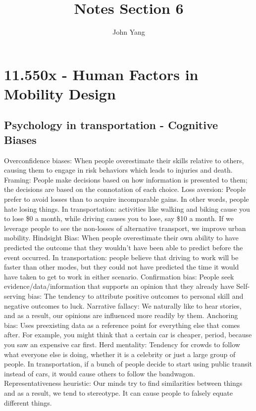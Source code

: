 \documentclass{article}
\title{Notes Section 6} %
\author{John Yang}
\begin{document}
    \maketitle
    \tableofcontents
    \section{11.550x - Human Factors in Mobility Design}
    \subsection{Psychology in transportation - Cognitive Biases}
    \begin{outline}
        \1 Overconfidence biases: When people overestimate their skills relative to others, causing them to engage in risk behaviors which leads to injuries and death. 
        \1 Framing: People make decisions based on how information is presented to them; the decisions are based on the connotation of each choice. 
        \1 Loss aversion: People prefer to avoid losses than to acquire incomparable gains. In other words, people hate losing things. 
            \2 In transportation: activities like walking and biking cause you to lose \$0 a month, while driving causes you to lose, say \$10 a month. If we leverage people to see the non-losses of alternative transport, we improve urban mobility. 
        \1 Hindsight Bias: When people overestimate their own ability to have predicted the outcome that they wouldn't have been able to predict before the event occurred. 
            \2 In transportation: people believe that driving to work will be faster than other modes, but they could not have predicted the time it would have taken to get to work in either scenario. 
        \1 Confirmation bias: People seek evidence/data/information that supports an opinion that they already have
        \1 Self-serving bias: The tendency to attribute positive outcomes to personal skill and negative outcomes to luck. 
        \1 Narrative fallacy: We naturally like to hear stories, and as a result, our opinions are influenced more readily by them. 
        \1 Anchoring bias: Uses preexisting data as a reference point for everything else that comes after. For example, you might think that a certain car is cheaper, period, because you saw an expensive car first. 
        \1 Herd mentality: Tendency for crowds to follow what everyone else is doing, whether it is a celebrity or just a large group of people. 
            \2 In transportation, if a bunch of people decide to start using public transit instead of cars, it would cause others to follow the bandwagon. 
        \1 Representativeness heuristic: Our minds try to find similarities between things and as a result, we tend to stereotype. It can cause people to falsely equate different things. 
    \end{outline}
\end{document}
